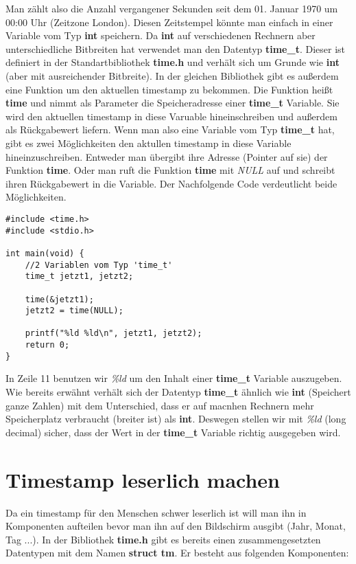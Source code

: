 \documentclass[c_worksheet.tex]{subfiles}
\begin{document}
\vspace{5pt}
Man zählt also die Anzahl vergangener Sekunden seit dem 01. Januar 1970 um 00:00 Uhr (Zeitzone London). Diesen Zeitstempel könnte man einfach in einer Variable vom Typ \textbf{int} speichern. Da \textbf{int} auf verschiedenen Rechnern aber unterschiedliche Bitbreiten hat verwendet man den Datentyp \textbf{time\_t}. Dieser ist definiert in der Standartbibliothek \textbf{time.h} und verhält sich um Grunde wie \textbf{int} (aber mit ausreichender Bitbreite). In der gleichen Bibliothek gibt es außerdem eine Funktion um den aktuellen timestamp zu bekommen. Die Funktion heißt \textbf{time} und nimmt als Parameter die Speicheradresse einer \textbf{time\_t} Variable. Sie wird den aktuellen timestamp in diese Varuable hineinschreiben und außerdem als Rückgabewert liefern. Wenn man also eine Variable vom Typ \textbf{time\_t} hat, gibt es zwei Möglichkeiten den aktullen timestamp in diese Variable hineinzuschreiben. Entweder man übergibt ihre Adresse (Pointer auf sie) der Funktion \textbf{time}. Oder man ruft die Funktion \textbf{time} mit \textit{NULL} auf und schreibt ihren Rückgabewert in die Variable. Der Nachfolgende Code verdeutlicht beide Möglichkeiten.\\


\begin{lstlisting}
#include <time.h>
#include <stdio.h>

int main(void) {
    //2 Variablen vom Typ 'time_t'
    time_t jetzt1, jetzt2;

    time(&jetzt1);
    jetzt2 = time(NULL);

    printf("%ld %ld\n", jetzt1, jetzt2);
    return 0;
}
\end{lstlisting}

In Zeile 11 benutzen wir \textit{\%ld} um den Inhalt einer \textbf{time\_t} Variable auszugeben. Wie bereits erwähnt verhält sich der Datentyp \textbf{time\_t} ähnlich wie \textbf{int} (Speichert ganze Zahlen) mit dem Unterschied, dass er auf macnhen Rechnern mehr Speicherplatz verbraucht (breiter ist) als \textbf{int}. Deswegen stellen wir mit \textit{\%ld} (long decimal) sicher, dass der Wert in der \textbf{time\_t} Variable richtig ausgegeben wird.

\section{Timestamp leserlich machen}

Da ein timestamp für den Menschen schwer leserlich ist will man ihn in Komponenten aufteilen bevor man ihn auf den Bildschirm ausgibt (Jahr, Monat, Tag ...).
In der Bibliothek \textbf{time.h} gibt es bereits einen zusammengesetzten Datentypen mit dem Namen \textbf{struct tm}. Er besteht aus folgenden Komponenten:
\end{document}
